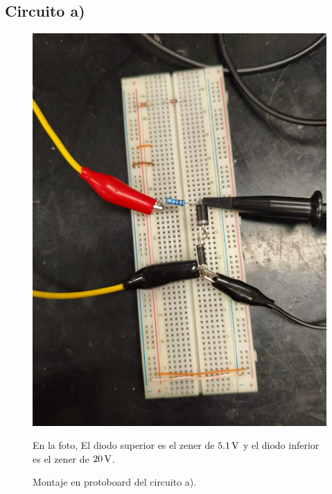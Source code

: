 \documentclass[chaptersright]{informeutn}
\begin{document}
\subsection*{Circuito a)}
\begin{figure}[H]
    \centering
    \begin{minipage}{0.46\textwidth}
    \centering
    \includegraphics[width=\textwidth]{pictures/circuito_A.jpeg}
    \caption{Montaje en protoboard del circuito a).}
    En la foto, El diodo superior es el zener de $5.1\,\mathrm{V}$ y el diodo inferior es el zener de $20\,\mathrm{V}$.
\end{minipage}
\hspace{0.05\textwidth}
    \begin{minipage}{0.46\textwidth}
    \centering

\end{minipage}
\end{figure}
\end{document}
